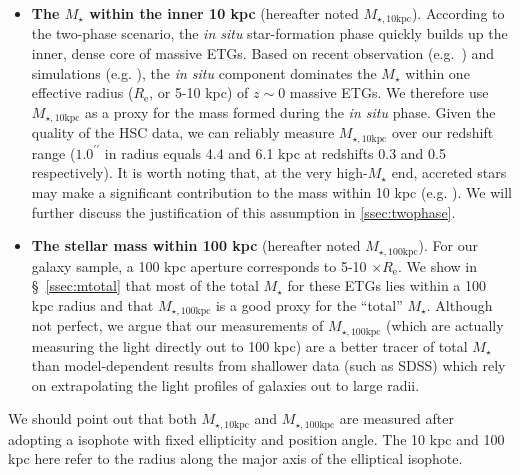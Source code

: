 \documentclass[a4paper,fleqn,usenatbib]{mnras}
\def\arcsec{{\prime\prime}}
\def\mstar{{$M_{\star}$}}
\def\minn{{$M_{\star,10\mathrm{kpc}}$}}
\def\mtot{{$M_{\star,100\mathrm{kpc}}$}}
\begin{document}
    \begin{itemize} 
       
        \item \textbf{The \mstar{} within the inner 10 kpc} 
            (hereafter noted \minn{}). 
            According to the two-phase scenario, the \textit{in situ} star-formation 
            phase quickly builds up the inner, dense core of massive ETGs.  
            Based on recent observation (e.g.~\citealt{vanDokkum2010}) and 
            simulations (e.g. \citealt{RodriguezGomez2016}), the \textit{in situ} 
            component dominates the \mstar{} within one effective radius 
            ($R_{\mathrm{e}}$, or 5-10 kpc) of $z{\sim}0$ massive ETGs.
            We therefore use \minn{} as a proxy for the mass formed during the 
            \textit{in situ} phase. 
            Given the quality of the HSC data, we can reliably measure \minn{} over 
            our redshift range ($1.0^{\arcsec}$ in radius equals 4.4 and 6.1 kpc 
            at redshifts 0.3 and 0.5 respectively).  
            It is worth noting that, at the very high-\mstar{} end, accreted stars 
            may make a significant contribution to the mass within 10 kpc 
            (e.g. \citealt{RodriguezGomez2016}). 
            We will further discuss the justification of this assumption in 
            \ref{ssec:twophase}.
            
        \item \textbf{The stellar mass within 100 kpc} 
            (hereafter noted \mtot{}). 
            For our galaxy sample, a 100 kpc aperture corresponds to 5-10 
            $\times R_{\mathrm{e}}$. 
            We show in \S~\ref{ssec:mtotal} that most of the total \mstar{} for 
            these ETGs lies within a 100 kpc radius and that \mtot{} is 
            a good proxy for the ``total'' \mstar{}. 
            Although not perfect, we argue that our measurements of \mtot{} (which are 
            actually measuring the light directly out to 100 kpc) are a better tracer 
            of total \mstar{} than model-dependent results from shallower data 
            (such as SDSS) which rely on extrapolating the light profiles of galaxies 
            out to large radii.
            
       \end{itemize}
       
    We should point out that both \minn{} and \mtot{} are measured after adopting a 
    isophote with fixed ellipticity and position angle. 
    The 10 kpc and 100 kpc here refer to the radius along the major axis of the 
    elliptical isophote. 
       
\end{document}

